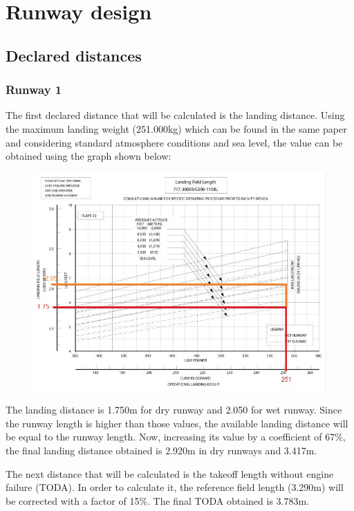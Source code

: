 \chapter{Runway design}

	\section{Declared distances}
		\subsection{Runway 1}
	
		The first declared distance that will be calculated is the landing distance. Using the maximum landing weight (251.000kg) which can be found in the same paper and considering standard atmosphere conditions and sea level, the value can be obtained using the graph shown below: 
		
		\begin{figure}[H]
			\centering
			\includegraphics[clip, trim=0cm 0cm 0cm 0cm, width=1\textwidth]{./images/B777/landingdistance777}
			\label{} %
		\end{figure}
		
		The landing distance is 1.750m for dry runway and 2.050 for wet runway. Since the runway length is higher than those values, the available landing distance will be equal to the runway length.	Now, increasing its value by a coefficient of 67\%, the final landing distance obtained is 2.920m in dry runways and 3.417m. 
		
		The next distance that will be calculated is the takeoff length without engine failure (TODA). In order to calculate it, the reference field length (3.290m) will be corrected with a factor of 15\%.  The final TODA obtained is 3.783m.
		
